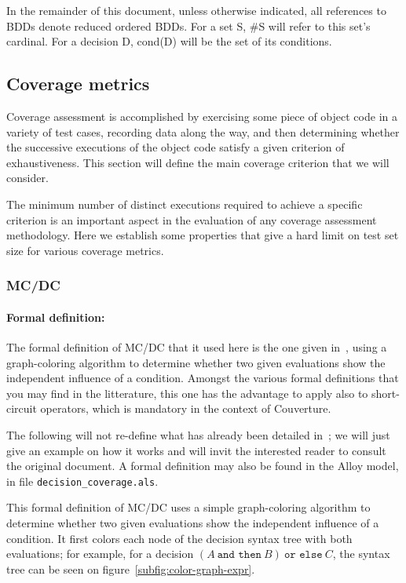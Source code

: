 \documentclass[a4paper,12pt,twoside]{article}
\newcommand{\couv}{{\sc Couverture}}
\newcommand{\andthen}{\texttt{and then}}
\newcommand{\orelse}{\texttt{or else}}
\newcommand{\alloyspec}[1]{\texttt{#1}}
\begin{document}
In the remainder of this document, unless otherwise indicated, all
references to BDDs denote reduced ordered BDDs. For a set S, \#S will
refer to this set's cardinal. For a decision D, cond(D) will be the
set of its conditions.

\subsection{Coverage metrics}

Coverage assessment is accomplished by exercising some piece of object
code in a variety of test cases, recording data along the way, and
then determining whether the successive executions of the object code
satisfy a given criterion of exhaustiveness. This section will define
the main coverage criterion that we will consider.

The minimum number of distinct executions required to achieve a
specific criterion is an important aspect in the evaluation of any
coverage assessment methodology. Here we establish some properties
that give a hard limit on test set size for various coverage metrics.

\subsubsection{MC/DC}

\paragraph{Formal definition:}

The formal definition of MC/DC that it used here is the one given
in~\cite{ar0118}, using a graph-coloring algorithm to determine
whether two given evaluations show the independent influence of a
condition. Amongst the various formal definitions that you may find in
the litterature, this one has the advantage to apply also to
short-circuit operators, which is mandatory in the context of \couv{}.

The following will not re-define what has already been detailed
in~\cite{ar0118}; we will just give an example on how it works and
will invit the interested reader to consult the original document. A
formal definition may also be found in the Alloy model, in file
\alloyspec{decision\_coverage.als}.

This formal definition of MC/DC uses a simple graph-coloring algorithm
to determine whether two given evaluations show the independent
influence of a condition. It first colors each node of the decision
syntax tree with both evaluations; for example, for a decision
$(A \ \andthen{} \ B) \ \orelse{} \ C$, the syntax tree can be seen
on figure~\ref{subfig:color-graph-expr}.
\end{document}
